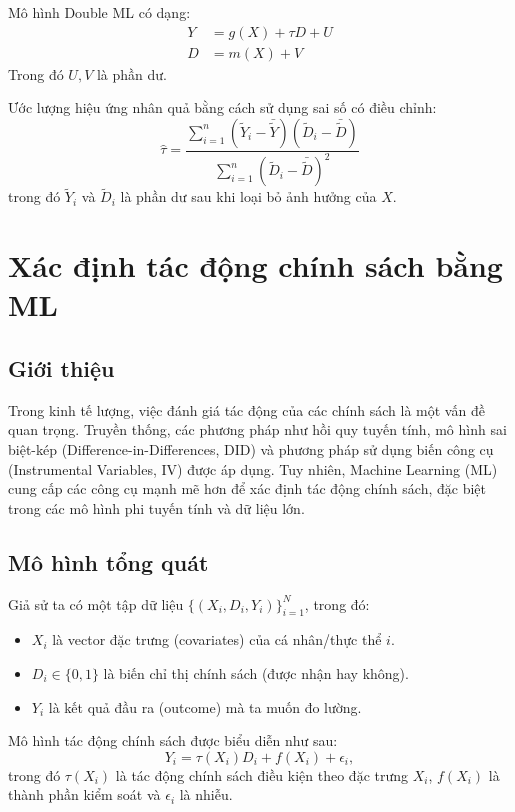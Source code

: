 Mô hình Double ML có dạng:
\begin{align}
Y &= g(X) + \tau D + U \\
D &= m(X) + V
\end{align}
Trong đó $U, V$ là phần dư.

Ước lượng hiệu ứng nhân quả bằng cách sử dụng sai số có điều chỉnh:
\begin{equation}
\hat{\tau} = \frac{\sum_{i=1}^{n} (\tilde{Y}_i - \bar{\tilde{Y}})(\tilde{D}_i - \bar{\tilde{D}})}{\sum_{i=1}^{n} (\tilde{D}_i - \bar{\tilde{D}})^2}
\end{equation}
trong đó $\tilde{Y}_i$ và $\tilde{D}_i$ là phần dư sau khi loại bỏ ảnh hưởng của $X$.




\section{Xác định tác động chính sách bằng ML}
\subsection{Giới thiệu}
Trong kinh tế lượng, việc đánh giá tác động của các chính sách là một vấn đề quan trọng. Truyền thống, các phương pháp như hồi quy tuyến tính, mô hình sai biệt-kép (Difference-in-Differences, DID) và phương pháp sử dụng biến công cụ (Instrumental Variables, IV) được áp dụng. Tuy nhiên, Machine Learning (ML) cung cấp các công cụ mạnh mẽ hơn để xác định tác động chính sách, đặc biệt trong các mô hình phi tuyến tính và dữ liệu lớn.

\subsection{Mô hình tổng quát}
Giả sử ta có một tập dữ liệu $\{(X_i, D_i, Y_i)\}_{i=1}^{N}$, trong đó:
\begin{itemize}
    \item $X_i$ là vector đặc trưng (covariates) của cá nhân/thực thể $i$.
    \item $D_i \in \{0,1\}$ là biến chỉ thị chính sách (được nhận hay không).
    \item $Y_i$ là kết quả đầu ra (outcome) mà ta muốn đo lường.
\end{itemize}

Mô hình tác động chính sách được biểu diễn như sau:
\begin{equation}
    Y_i = \tau(X_i) D_i + f(X_i) + \epsilon_i,
\end{equation}
trong đó $\tau(X_i)$ là tác động chính sách điều kiện theo đặc trưng $X_i$, $f(X_i)$ là thành phần kiểm soát và $\epsilon_i$ là nhiễu.

